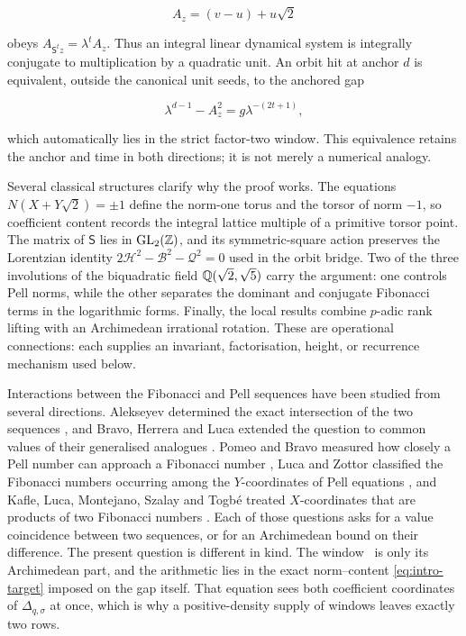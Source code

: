 \begin{equation}
 A_z=(v-u)+u\sqrt2
 \label{eq:intro-seed-map}
\end{equation}

obeys $A_{\mathsf S^tz}=\lambda^tA_z$. Thus an integral linear dynamical
system is integrally conjugate to multiplication by a quadratic unit. An orbit hit
at anchor $d$ is equivalent, outside the canonical unit seeds, to the
anchored gap

\begin{equation}
 \lambda^{d-1}-A_z^2=g\lambda^{-(2t+1)},
 \label{eq:intro-anchored-gap}
\end{equation}

which automatically lies in the strict factor-two window. This equivalence
retains the anchor and time in both directions; it is not merely a numerical
analogy.

Several classical structures clarify why the proof works. The equations
$N(X+Y\sqrt2)=\pm1$ define the norm-one torus and the torsor of norm $-1$, so
coefficient content records the integral lattice multiple of a primitive
torsor point. The matrix of $\mathsf S$ lies in $\mathrm{GL}_2(\mathbb{Z})$, and
its symmetric-square action preserves the Lorentzian identity
$2\mathcal H^2-\mathcal B^2-\mathcal Q^2=0$ used in the orbit bridge.
Two of the three involutions of the biquadratic field $\mathbb{Q}(\sqrt2,\sqrt5)$
carry the argument: one controls Pell norms, while the other separates the
dominant and conjugate Fibonacci terms in the logarithmic forms. Finally,
the local results combine $p$-adic rank lifting with an Archimedean irrational
rotation. These are operational connections: each supplies an invariant,
factorisation, height, or recurrence mechanism used below.

Interactions between the Fibonacci and Pell sequences have been studied from
several directions. Alekseyev determined the exact intersection of the two
sequences \cite{Alekseyev2011}, and Bravo, Herrera and Luca extended the
question to common values of their generalised analogues
\cite{BravoHerreraLuca2021}. Pomeo and Bravo measured how closely a Pell
number can approach a Fibonacci number \cite{PomeoBravo2024}, Luca and Zottor
classified the Fibonacci numbers occurring among the $Y$-coordinates of Pell
equations \cite{LucaZottor2023}, and Kafle, Luca, Montejano, Szalay and
Togb\'e treated $X$-coordinates that are products of two Fibonacci numbers
\cite{KafleEtAl2019}. Each of those questions asks for a value coincidence
between two sequences, or for an Archimedean bound on their difference. The
present question is different in kind. The
window~ is only its Archimedean part, and the arithmetic lies
in the exact norm--content \cref{eq:intro-target} imposed on the gap
itself. That equation sees both coefficient coordinates of
$\Delta_{q,\sigma}$ at once, which is why a positive-density supply of
windows leaves exactly two rows.

